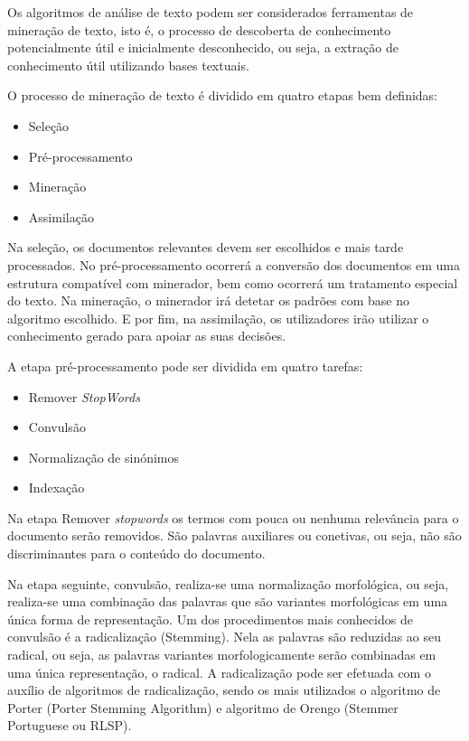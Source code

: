 \documentclass[a4paper,10pt]{article}
\begin{document}
Os algoritmos de análise de texto podem ser considerados ferramentas de mineração de texto, isto é, o processo de descoberta de conhecimento potencialmente útil e inicialmente desconhecido, ou seja, a extração de conhecimento útil utilizando bases textuais.

O processo de mineração de texto é dividido em quatro etapas bem definidas:
\begin{itemize}
    \item Seleção
    \item Pré-processamento
    \item Mineração
    \item Assimilação
\end{itemize}

Na seleção, os documentos relevantes devem ser escolhidos e mais tarde processados.
No pré-processamento ocorrerá a conversão dos documentos em uma estrutura compatível com minerador, bem como ocorrerá um tratamento especial do texto.
Na mineração, o minerador irá detetar os padrões com base no algoritmo escolhido.
E por fim, na assimilação, os utilizadores irão utilizar o conhecimento gerado para apoiar as suas decisões.

A etapa pré-processamento pode ser dividida em quatro tarefas:
\begin{itemize}
    \item Remover \textit{StopWords}
    \item Convulsão
    \item Normalização de sinónimos
    \item Indexação
\end{itemize}

Na etapa Remover \textit{stopwords} os termos com pouca ou nenhuma relevância para o documento serão removidos.
São palavras auxiliares ou conetivas, ou seja, não são discriminantes para o conteúdo do documento.

Na etapa seguinte, convulsão, realiza-se uma normalização morfológica, ou seja, realiza-se uma combinação das palavras que são variantes morfológicas em uma única forma de representação.
Um dos procedimentos mais conhecidos de convulsão é a radicalização (Stemming). Nela as palavras são reduzidas ao seu radical, ou seja, as palavras variantes morfologicamente serão combinadas em uma única representação, o radical. A radicalização pode ser efetuada com o auxílio de algoritmos de radicalização, sendo os mais utilizados o algoritmo de Porter (Porter Stemming Algorithm) e algoritmo de Orengo (Stemmer Portuguese ou RLSP).
\end{document}
